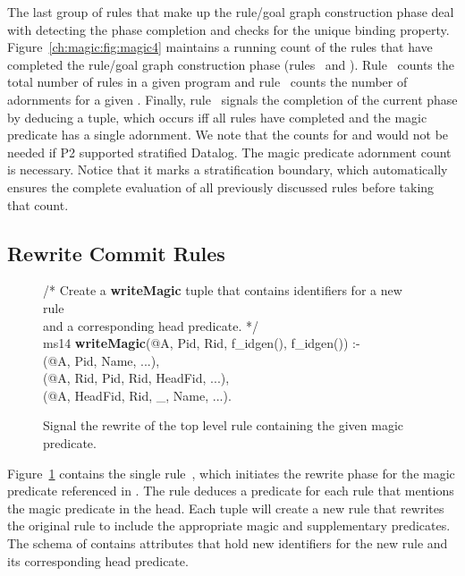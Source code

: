 The last group of rules that make up the rule/goal graph construction phase
deal with detecting the phase completion and checks for the unique binding
property.  Figure~\ref{ch:magic:fig:magic4} maintains a running count of the
rules that have completed the rule/goal graph construction phase
(rules~ and ).  Rule~ counts the total number of rules
in a given program and rule~ counts the number of adornments for a
given .  Finally, rule~ signals the completion of the
current phase by deducing a  tuple, which occurs iff all
rules have completed and the magic predicate has a single adornment.  We note
that the counts for  and  would not be
needed if P2 supported stratified Datalog.  The magic predicate adornment count
is necessary.  Notice that it marks a stratification boundary, which
automatically ensures the complete evaluation of all previously discussed rules
before taking that count.


\subsection{Rewrite Commit Rules}
\label{ch:magic:sec:rewrite}
 
\begin{figure}[!t]
\ssp
\centering
\begin{boxedminipage}{\linewidth}
/* Create a {\bf writeMagic} tuple that contains identifiers for a new rule \\
and a corresponding head predicate. */ \\
ms14 {\bf writeMagic}(@A, Pid, Rid, f\_idgen(), f\_idgen()) :- \\
(@A, Pid, Name, ...), \\
(@A, Rid, Pid, Rid, HeadFid, ...), \\
(@A, HeadFid, Rid, \_, Name, ...). \\
\end{boxedminipage}
\caption{\label{ch:magic:fig:rewrite1} Signal the rewrite of the top level rule 
containing the given magic predicate.}
\end{figure}

Figure~\ref{ch:magic:fig:rewrite1} contains the single rule~, which
initiates the rewrite phase for the magic predicate referenced in
.  The rule deduces a  predicate for each
rule that mentions the magic predicate in the head.  Each  tuple
will create a new rule that rewrites the original rule to include the
appropriate magic and supplementary predicates.  The schema of 
contains attributes that hold new identifiers for the new rule and its
corresponding head predicate.

